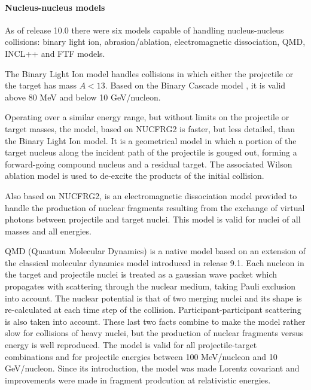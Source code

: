 \paragraph{Nucleus-nucleus models}
As of release 10.0 there were six \Gfour{} models capable of handling
nucleus-nucleus collisions: binary light ion, abrasion/ablation, 
electromagnetic dissociation, QMD, INCL++ and FTF models.

The Binary Light Ion model handles collisions in which either the projectile or
the target has mass $A < 13$.  Based on the \Gfour{} Binary Cascade model 
\cite{hadbib:binary}, it is valid above 80 MeV and below 10 GeV/nucleon. 

Operating over a similar energy range, but without limits on the projectile or
target masses, the  model, based on NUCFRG2 
\cite{hadbib:wilson} is faster, but less detailed, than the Binary Light Ion 
model.  It is a geometrical model in which a portion of the target nucleus along
the incident path of the projectile is gouged out, forming a forward-going 
compound nucleus and a residual target.  The associated Wilson ablation model is
used to de-excite the products of the initial collision.

Also based on NUCFRG2,  is an electromagnetic 
dissociation model provided to handle the production of nuclear fragments 
resulting from the exchange of virtual photons between projectile and target 
nuclei.  This model is valid for nuclei of all masses and all energies.
  
QMD (Quantum Molecular Dynamics) is a native \Gfour{} model based on an extension
of the classical molecular dynamics model introduced in release 9.1.  Each 
nucleon in the target and projectile nuclei is treated as a gaussian wave packet
which propagates with scattering through the nuclear medium, taking Pauli 
exclusion into account.  The nuclear potential is that of two merging nuclei and
its shape is re-calculated at each time step of the collision.  
Participant-participant scattering is also taken into account.  
These last two facts combine to make the model rather slow for collisions of
heavy nuclei, but the production of nuclear fragments versus energy is well 
reproduced.  The model is valid for all projectile-target combinations and for
projectile energies between 100 MeV/nucleon and 10 GeV/nucleon.  Since its
introduction, the model was made Lorentz covariant and improvements were made in
fragment prodcution at relativistic energies.
 
